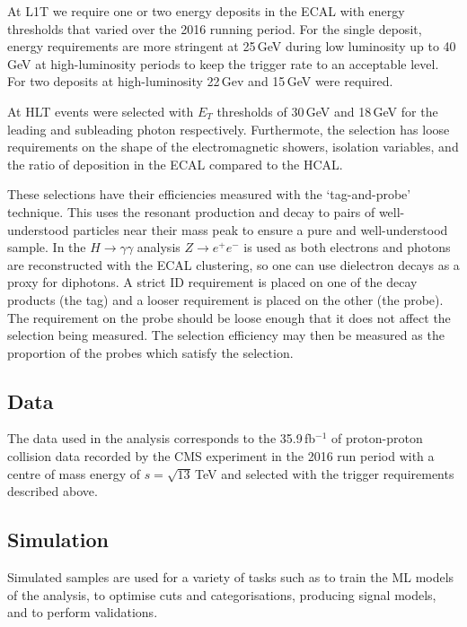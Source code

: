 At L1T we require one or two energy deposits in the ECAL with energy thresholds that varied over the 2016 running period. For the single deposit, energy requirements are more stringent at 25\,GeV during low luminosity up to 40\,GeV at high-luminosity periods to keep the trigger rate to an acceptable level. For two deposits at high-luminosity 22\,Gev and 15\,GeV were required. 

At HLT events were selected with $E_{T}$ thresholds of 30\,GeV and 18\,GeV for the leading and subleading photon respectively. Furthermote, the selection has loose requirements on the shape of the electromagnetic showers, isolation variables, and the ratio of deposition in the ECAL compared to the HCAL. 

These selections have their efficiencies measured with the `tag-and-probe' technique. 
This uses the resonant production and decay to pairs of well-understood particles near their mass peak to ensure a pure and well-understood sample. 
In the $H\rightarrow{\gamma\gamma}$ analysis $Z\rightarrow{}e^{+}e^{-}$ is used as both electrons and photons are reconstructed with the ECAL clustering, so one can use dielectron decays as a proxy for diphotons. 
A strict ID requirement is placed on one of the decay products (the tag) and a looser requirement is placed on the other (the probe). 
The requirement on the probe should be loose enough that it does not affect the selection being measured. The selection efficiency may then be measured as the proportion of the probes which satisfy the selection.


\subsection{Data}
The data used in the analysis corresponds to the 35.9\,fb$^{-1}$ of proton-proton collision data recorded by the CMS experiment in the 2016 run period with a centre of mass energy of $s=\sqrt{13}$\,TeV and selected with the trigger requirements described above. 



\subsection{Simulation}

Simulated samples are used for a variety of tasks such as to train the ML models of the analysis, to optimise cuts and categorisations, producing signal models, and to perform validations. 

